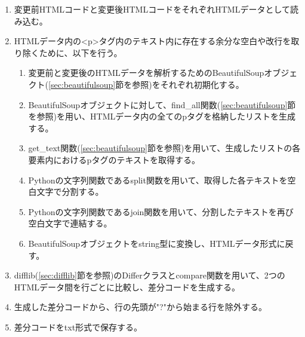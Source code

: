 \begin{enumerate}
    \item 変更前HTMLコードと変更後HTMLコードをそれぞれHTMLデータとして読み込む。
    \item HTMLデータ内の<p>タグ内のテキスト内に存在する余分な空白や改行を取り除くために、以下を行う。
          \begin{enumerate}
              \item 変更前と変更後のHTMLデータを解析するためのBeautifulSoupオブジェクト(\ref{sec:beautifulsoup}節を参照)をそれぞれ初期化する。
              \item BeautifulSoupオブジェクトに対して、find\_all関数(\ref{sec:beautifulsoup}節を参照)を用い、HTMLデータ内の全てのpタグを格納したリストを生成する。
              \item get\_text関数(\ref{sec:beautifulsoup}節を参照)を用いて、生成したリストの各要素内におけるpタグのテキストを取得する。
              \item Pythonの文字列関数であるsplit関数を用いて、取得した各テキストを空白文字で分割する。
              \item Pythonの文字列関数であるjoin関数を用いて、分割したテキストを再び空白文字で連結する。
              \item BeautifulSoupオブジェクトをstring型に変換し、HTMLデータ形式に戻す。
          \end{enumerate}
    \item difflib(\ref{sec:difflib}節を参照)のDifferクラスとcompare関数を用いて、2つのHTMLデータ間を行ごとに比較し、差分コードを生成する。
    \item 生成した差分コードから、行の先頭が"?"から始まる行を除外する。
    \item 差分コードをtxt形式で保存する。
\end{enumerate}



